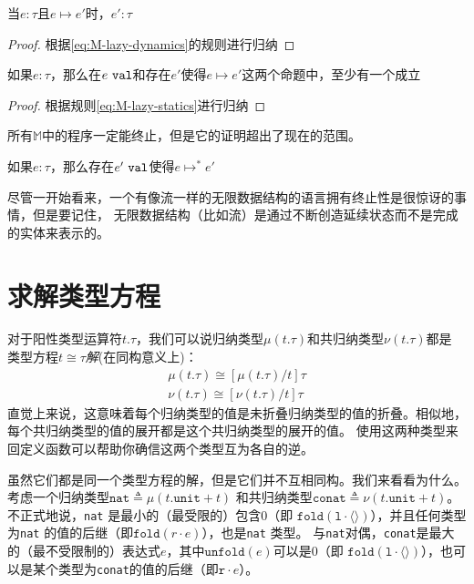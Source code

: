 \begin{lemma}
	当$e:\tau$且$e\mapsto e'$时，$e':\tau$
\end{lemma}

\begin{proof}
	根据\ref{eq:M-lazy-dynamics}的规则进行归纳
\end{proof}

\begin{lemma}
	如果$e:\tau$，那么在$e\ \normalfont\texttt{val}$和存在$e'$使得$e\mapsto e'$这两个命题中，至少有一个成立
\end{lemma}

\begin{proof}
	根据规则\ref{eq:M-lazy-statics}进行归纳
\end{proof}

所有$\mathbb{M}$中的程序一定能终止，但是它的证明超出了现在的范围。

\begin{theorem}
	如果$e:\tau$，那么存在$e'\ \normalfont\texttt{val}$使得$e\mapsto^*e'$
\end{theorem}

尽管一开始看来，一个有像流一样的无限数据结构的语言拥有终止性是很惊讶的事情，但是要记住，
无限数据结构（比如流）是通过不断创造延续状态而不是完成的实体来表示的。

\section{求解类型方程}

\noindent 对于阳性类型运算符$t.\tau$，我们可以说归纳类型$\mu(t.\tau)$和共归纳类型$\nu(t.\tau)$都是
类型方程$t\cong\tau$\textit{解}(在同构意义上)：
\begin{subequations}
	\begin{gather*}
	\mu(t.\tau)\cong[\mu(t.\tau)/t]\tau \\
	\nu(t.\tau)\cong[\nu(t.\tau)/t]\tau
	\end{gather*}
\end{subequations}
直觉上来说，这意味着每个归纳类型的值是未折叠归纳类型的值的折叠。相似地，每个共归纳类型的值的展开都是这个共归纳类型的展开的值。
使用这两种类型来回定义函数可以帮助你确信这两个类型互为各自的逆。

虽然它们都是同一个类型方程的解，但是它们并不互相同构。我们来看看为什么。考虑一个归纳类型$\texttt{nat}\triangleq\mu(t.\texttt{unit}+t)$
和共归纳类型$\texttt{conat}\triangleq\nu(t.\texttt{unit}+t)$。不正式地说，\texttt{nat} 是最小的（最受限的）包含0（即
$\texttt{fold}(\texttt{l}\cdot\langle\rangle)$），并且任何类型为\texttt{nat} 的值的后继（即$\texttt{fold}(r\cdot e)$），也是\texttt{nat} 类型。
与\texttt{nat}对偶，\texttt{conat}是最大的（最不受限制的）表达式$e$，其中$\texttt{unfold}(e)$可以是0（即
$\texttt{fold}(\texttt{l}\cdot\langle\rangle)$），也可以是某个类型为\texttt{conat}的值的后继（即$\texttt{r}\cdot e$）。

